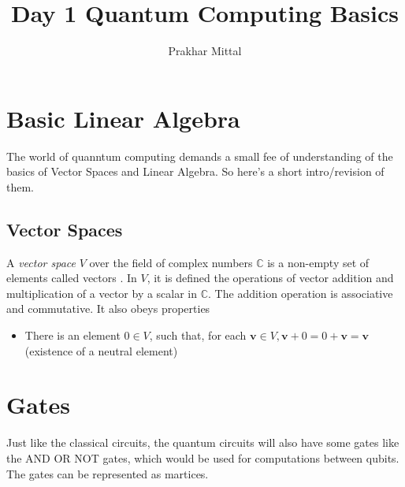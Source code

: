 \documentclass{article}
\title{Day 1 Quantum Computing Basics}
\author{Prakhar Mittal}
\begin{document}
    
\maketitle
\tableofcontents

\newpage

\section{Basic Linear Algebra}
The world of quanntum computing demands a small fee of understanding of the basics of 
Vector Spaces and Linear Algebra. So here's a short intro/revision of them.

    \subsection{Vector Spaces}
    A \emph{vector space} $V$ over the field of complex numbers $\mathbb{C}$ is a non-empty set of elements called vectors
    . In $V$, it is defined the operations of vector addition and multiplication of a vector by a scalar in
    $\mathbb{C}$. The addition operation is associative and commutative. It also obeys properties 
    \begin{itemize}
        \item There is an element $0 \in V$, such that, for each $\mathbf{v} \in V, \mathbf{v}+0=0+\mathbf{v}=\mathbf{v}$
        (existence of a neutral element) 
    \end{itemize}


\newpage

\section{Gates}
Just like the classical circuits, the quantum circuits will also have some gates like
the AND OR NOT gates, which would be used for computations between qubits.
The gates can be represented as martices.
\end{document}
